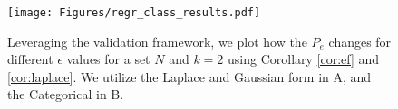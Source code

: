 \begin{figure}
    \centering
    \texttt{[image: Figures/regr\_class\_results.pdf]}
    \vspace{-10pt}
    \caption{ 
    Leveraging the validation framework, we plot how the $P_e$ changes for different $\epsilon$ values for a set $N$ and $k = 2$ using Corollary \ref{cor:ef} and \ref{cor:laplace}. We utilize the Laplace and Gaussian form in A, and the Categorical in B. 
    }
    \label{fig:validation}
\end{figure}




